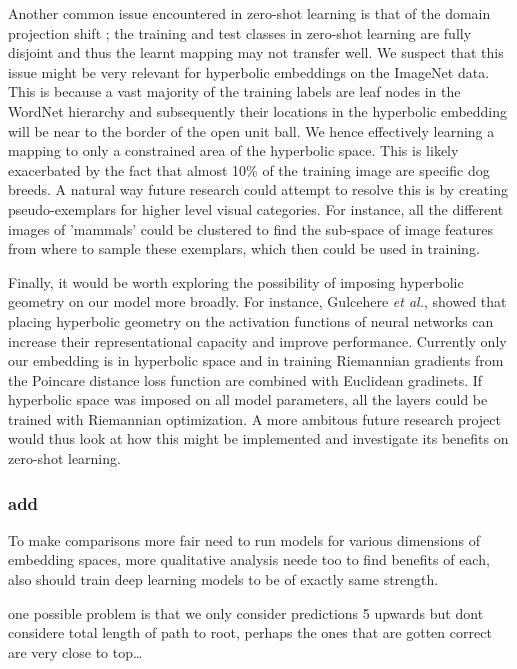 \documentclass[12pt]{report}
\begin{document}
Another common issue encountered in zero-shot learning is that of the domain projection shift \cite{Fu2015}; the training and test classes in zero-shot learning are fully disjoint and thus the learnt mapping may not transfer well. We suspect that this issue might be very relevant for hyperbolic embeddings on the ImageNet data. This is because a vast majority of the training labels are leaf nodes in the WordNet hierarchy and subsequently their locations in the hyperbolic embedding will be near to the border of the open unit ball. We hence effectively learning a mapping to only a constrained area of the hyperbolic space. This is likely exacerbated by the fact that almost 10\% \cite{Peterson2018} of the training image are specific dog breeds. A natural way future research could attempt to resolve this is by creating pseudo-exemplars for higher level visual categories. For instance, all the different images of 'mammals' could be clustered to find the sub-space of image features from where to sample these exemplars, which then could be used in training.

Finally, it would be worth exploring the possibility of imposing hyperbolic geometry on our model more broadly. For instance, Gulcehere \textit{et al.}, showed that placing hyperbolic geometry on the activation functions of neural networks can increase their representational capacity and improve performance. Currently only our embedding is in hyperbolic space and in training Riemannian gradients from the Poincare distance loss function are combined with Euclidean gradinets. If hyperbolic space was imposed on all model parameters, all the layers could be trained with Riemannian optimization. A more ambitous future research project would thus look at how this might be implemented and investigate its benefits on zero-shot learning.



\subsubsection{add}
To make comparisons more fair need to run models for various dimensions of embedding spaces, more qualitative analysis neede too to find benefits of each, also should train deep learning models to be of exactly same strength.

one possible problem is that we only consider predictions 5 upwards but dont considere total length of path to root, perhaps the ones that are gotten correct are very close to top\dots
\end{document}
